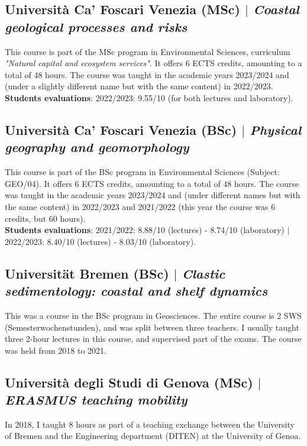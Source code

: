 \documentclass[11pt]{article}
\begin{document}
\bigskip
\subsection{Università Ca' Foscari Venezia (MSc) $|$ {\normalfont\textit{Coastal geological processes and risks}}}
{\footnotesize This course is part of the MSc program in Environmental Sciences, curriculum \textit{"Natural capital and ecosystem services"}. It offers 6 ECTS credits, amounting to a total of 48 hours. The course was taught in the academic years 2023/2024 and (under a slightly different name but with the same content) in 2022/2023.\\
\textbf{Students evaluations}: 2022/2023: 9.55/10 (for both lectures and laboratory).}
\bigskip

\subsection{Università Ca' Foscari Venezia (BSc) $|$ {\normalfont\textit{Physical geography and geomorphology}}}
{\footnotesize This course is part of the BSc program in Environmental Sciences (Subject: GEO/04). It offers 6 ECTS credits, amounting to a total of 48 hours. The course was taught in the academic years 2023/2024 and (under different names but with the same content) in 2022/2023 and 2021/2022 (this year the course was 6 credits, but 60 hours).\\
\textbf{Students evaluations}:
2021/2022: 8.88/10 (lectures) - 8.74/10 (laboratory) $|$ 2022/2023: 8.40/10 (lectures) - 8.03/10 (laboratory).}
\bigskip

\subsection{Universität Bremen (BSc) $|$ {\normalfont\textit{Clastic sedimentology: coastal and shelf dynamics}}}
{\footnotesize This was a course in the BSc program in Geosciences. The entire course is 2 SWS (Semesterwochenstunden), and was split between three teachers. I usually taught three 2-hour lectures in this course, and supervised part of the exams. The course was held from 2018 to 2021.}
\bigskip

\subsection{Università degli Studi di Genova (MSc) $|$ {\normalfont\textit{ERASMUS teaching mobility}}}
{\footnotesize In 2018, I taught 8 hours as part of a teaching exchange between the University of Bremen and the Engineering department (DITEN) at the University of Genoa.}
\bigskip
\end{document}
